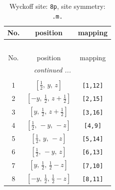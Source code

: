 \documentclass[fleqn,8pt]{jsarticle}
\begin{document}
\begin{longtable}{ccc}
\caption{Wyckoff site: {\tt 8p}, site symmetry: {\tt .m.}}
 \\
 \hline \hline
No. & position & mapping \\ \hline \endfirsthead

\multicolumn{2}{l}{\tablename\ \thetable{}} \\
 \hline \hline
No. & position & mapping \\ \hline \endhead

 \hline \hline
\multicolumn{2}{r}{\footnotesize\it continued ...} \\ \endfoot

 \hline \hline
\multicolumn{2}{r}{} \\ \endlastfoot

1 & $\left[ \frac{1}{2},\, y,\, z \right]$ & {\tt [1,12]} \\ \hline
2 & $\left[ - y,\, \frac{1}{2},\, z + \frac{1}{2} \right]$ & {\tt [2,15]} \\ \hline
3 & $\left[ y,\, \frac{1}{2},\, z + \frac{1}{2} \right]$ & {\tt [3,16]} \\ \hline
4 & $\left[ \frac{1}{2},\, - y,\, - z \right]$ & {\tt [4,9]} \\ \hline
5 & $\left[ \frac{1}{2},\, y,\, - z \right]$ & {\tt [5,14]} \\ \hline
6 & $\left[ \frac{1}{2},\, - y,\, z \right]$ & {\tt [6,13]} \\ \hline
7 & $\left[ y,\, \frac{1}{2},\, \frac{1}{2} - z \right]$ & {\tt [7,10]} \\ \hline
8 & $\left[ - y,\, \frac{1}{2},\, \frac{1}{2} - z \right]$ & {\tt [8,11]} \\
\end{longtable}
\renewcommand{\arraystretch}{1.2}
\end{document}
